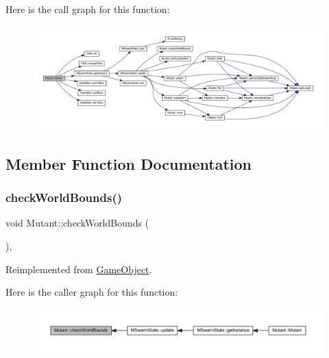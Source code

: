 Here is the call graph for this function\+:
\nopagebreak
\begin{figure}[H]
\begin{center}
\leavevmode
\includegraphics[width=350pt]{class_mutant_ae11d8a5d375b8b469a1125c5f3db059d_cgraph}
\end{center}
\end{figure}


\subsection{Member Function Documentation}
\mbox{\label{class_mutant_af5b703545939ef9295ecbe2762947995}} 
\subsubsection{\texorpdfstring{check\+World\+Bounds()}{checkWorldBounds()}}
{\footnotesize\ttfamily void Mutant\+::check\+World\+Bounds (\begin{DoxyParamCaption}{ }\end{DoxyParamCaption})\hspace{0.3cm}{\ttfamily [override]}, {\ttfamily [virtual]}}



Reimplemented from \hyperlink{class_game_object_a07bcaf0d87bd507f0a6e98abebd70e53}{Game\+Object}.

Here is the caller graph for this function\+:
\nopagebreak
\begin{figure}[H]
\begin{center}
\leavevmode
\includegraphics[width=350pt]{class_mutant_af5b703545939ef9295ecbe2762947995_icgraph}
\end{center}
\end{figure}
\mbox{\label{class_mutant_a64b25d92b0d694889047b71e3e501689}} 
